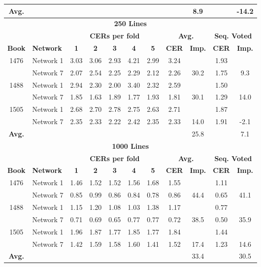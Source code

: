 \documentclass{jlcl}
\begin{document}
\begin{table}[tp]
\begin{tabular}{c|l|ccccc|cc|cc}
        \hline
        \textbf{Avg.} &         &      &      &      &      &      &      &  8.9 &      & -14.2 \\
        \hline
        \hline
        \multicolumn{11}{c}{\textbf{250 Lines}} \\
        \hline
        \hline
             &       &\multicolumn{5}{c|}{\textbf{CERs per fold}} & \multicolumn{2}{c}{\textbf{Avg.}} & \multicolumn{2}{c}{\textbf{Seq. Voted}} \\
        \hline
        \textbf{Book} & \textbf{Network} & \textbf{1} & \textbf{2} & \textbf{3} & \textbf{4} & \textbf{5} & \textbf{CER} & \textbf{Imp.} & \textbf{CER} & \textbf{Imp.} \\
        \hline
        1476 & Network 1 & 3.03 & 3.06 & 2.93 & 4.21 & 2.99 & 3.24 &      & 1.93 &       \\
             & Network 7 & 2.07 & 2.54 & 2.25 & 2.29 & 2.12 & 2.26 & 30.2 & 1.75 &   9.3 \\
        1488 & Network 1 & 2.94 & 2.30 & 2.00 & 3.40 & 2.32 & 2.59 &      & 1.50 &       \\
             & Network 7 & 1.85 & 1.63 & 1.89 & 1.77 & 1.93 & 1.81 & 30.1 & 1.29 &  14.0 \\
        1505 & Network 1 & 2.68 & 2.70 & 2.78 & 2.75 & 2.63 & 2.71 &      & 1.87 &       \\
             & Network 7 & 2.35 & 2.33 & 2.22 & 2.42 & 2.35 & 2.33 & 14.0 & 1.91 &  -2.1 \\
        \hline
        \textbf{Avg.} &         &      &      &      &      &      &      & 25.8 &      &   7.1 \\
        \hline
        \hline
        \multicolumn{11}{c}{\textbf{1000 Lines}} \\
        \hline
        \hline
             &       &\multicolumn{5}{c|}{\textbf{CERs per fold}} & \multicolumn{2}{c}{\textbf{Avg.}} & \multicolumn{2}{c}{\textbf{Seq. Voted}} \\
        \hline
        \textbf{Book} & \textbf{Network} & \textbf{1} & \textbf{2} & \textbf{3} & \textbf{4} & \textbf{5} & \textbf{CER} & \textbf{Imp.} & \textbf{CER} & \textbf{Imp.} \\
        \hline
        1476 & Network 1 & 1.46 & 1.52 & 1.52 & 1.56 & 1.68 & 1.55 &      & 1.11 &       \\
             & Network 7 & 0.85 & 0.99 & 0.86 & 0.84 & 0.78 & 0.86 & 44.4 & 0.65 &  41.1 \\
        1488 & Network 1 & 1.15 & 1.20 & 1.08 & 1.03 & 1.38 & 1.17 &      & 0.77 &       \\
             & Network 7 & 0.71 & 0.69 & 0.65 & 0.77 & 0.77 & 0.72 & 38.5 & 0.50 &  35.9 \\
        1505 & Network 1 & 1.96 & 1.87 & 1.77 & 1.85 & 1.77 & 1.84 &      & 1.44 &       \\
             & Network 7 & 1.42 & 1.59 & 1.58 & 1.60 & 1.41 & 1.52 & 17.4 & 1.23 &  14.6 \\
        \hline
        \textbf{Avg.} &         &      &      &      &      &      &      & 33.4 &      &  30.5 \\
        \hline


\end{tabular}
\end{table}
\end{document}
